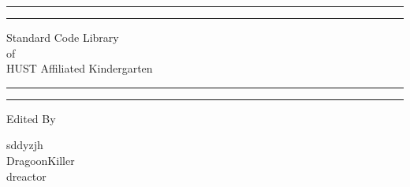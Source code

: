\documentclass[UTF8]{ctexart}
\begin{document}
\begin{titlepage} %

	\centering %
	
	\scshape %
	
	\vspace*{\baselineskip} %
	
	
	\rule{\textwidth}{1.6pt}\vspace*{-\baselineskip}\vspace*{2pt} %
	\rule{\textwidth}{0.4pt} %
	
	\vspace{0.75\baselineskip} %
	
	{\LARGE Standard Code Library\\ of\\ HUST Affiliated Kindergarten\\} %
	
	\vspace{0.75\baselineskip} %
	
	\rule{\textwidth}{0.4pt}\vspace*{-\baselineskip}\vspace{3.2pt} %
	\rule{\textwidth}{1.6pt} %
	
	\vspace{2\baselineskip} %
	
	
	
	\vspace*{3\baselineskip} %
	
	
	Edited By
	
	\vspace{0.5\baselineskip} %
	
	{\protect sddyzjh \\ DragoonKiller \\ dreactor \\} %
	

\end{titlepage}
\end{document}
